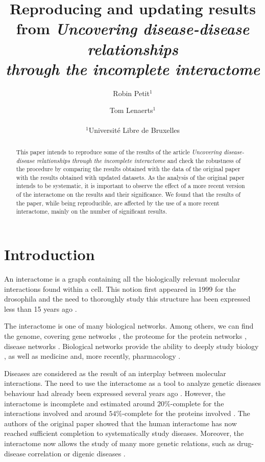 \documentclass[letterpaper]{article}
\title{Reproducing and updating results from
\textit{Uncovering disease-disease relationships\\through the incomplete interactome}}
\author{Robin Petit$^{1}$ \and Tom Lenaerts$^{1}$\\
\mbox{}\\
$^1$Université Libre de Bruxelles}
\begin{document}
\maketitle

\begin{abstract}
This paper intends to reproduce some of the results of the article \textit{Uncovering
disease-disease relationships through the incomplete interactome} \citep{originalPaper}
and check the robustness of the procedure by comparing the results obtained with the data
of the original paper with the results obtained with updated datasets. As the analysis of
the original paper intends to be systematic, it is important to observe the effect of a
more recent version of the interactome on the results and their significance. We found that
the results of the paper, while being reproducible, are affected by the use of a more recent
interactome, mainly on the number of significant results.
\end{abstract}

\section{Introduction}
An interactome is a graph containing all the biologically relevant molecular interactions found within
a cell. This notion first appeared in 1999 for the drosophila \citep{sanchez1999grasping} and the need
to thoroughly study this structure has been expressed less than 15 years ago
\citep{UnderstandingTheCellFunctionalOrganization}.

The interactome is one of many biological networks. Among others, we can find the genome, covering
gene networks \citep{boucher2013genetic}, the proteome for the protein networks
\citep{rolland2014proteome}, disease networks \citep{goh2007human}. Biological networks provide the
ability to deeply study biology \citep{UnderstandingTheCellFunctionalOrganization}, as well as
medicine \citep{barabasi2011network} and, more recently, pharmacology \citep{hopkins2008network}.

Diseases are considered as the result of an interplay between molecular interactions. The need to use
the interactome as a tool to analyze genetic diseases behaviour had already been expressed several years
ago \citep{vidal2011interactome}. However, the interactome is incomplete and estimated around $20\%$-complete
for the interactions involved and around $54\%$-complete for the proteins involved
\citep{ATruerMeasureOfOurIgnorance,estimatingTheSizeOfTheHumanInteractome}. The authors of the original paper
\citep{originalPaper} showed that the human interactome has now reached sufficient completion to systematically
study diseases. Moreover, the interactome now allows the study of many more genetic relations, such as
drug-disease correlation \citep{Yu2016extraction} or digenic diseases \citep{gazzo2015dida}.
\end{document}
